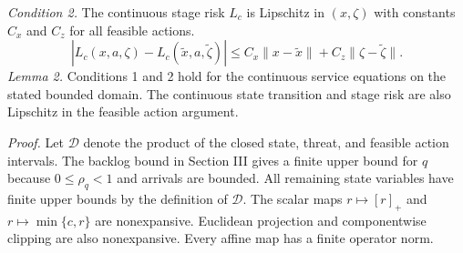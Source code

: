 \textit{Condition 2.}  The continuous stage risk $L_c$ is Lipschitz in
$(x,\zeta)$ with constants $C_x$ and $C_z$ for all feasible actions.
\begin{equation}
|L_c(x,a,\zeta)-L_c(\tilde x,a,\tilde\zeta)|
\le C_x\|x-\tilde x\|+C_z\|\zeta-\tilde \zeta\|.
\end{equation}
\textit{Lemma 2.}  Conditions 1 and 2 hold for the continuous service equations
on the stated bounded domain.  The continuous state transition and stage risk
are also Lipschitz in the feasible action argument.

\textit{Proof.}  Let $\mathcal D$ denote the product of the closed state,
threat, and feasible action intervals.  The backlog bound in Section III gives
a finite upper bound for $q$ because $0\le\rho_q<1$ and arrivals are bounded.
All remaining state variables have finite upper bounds by the definition of
$\mathcal D$.  The scalar maps $r\mapsto[r]_+$ and
$r\mapsto\min\{c,r\}$ are nonexpansive.  Euclidean projection and componentwise
clipping are also nonexpansive.  Every affine map has a finite operator norm.


